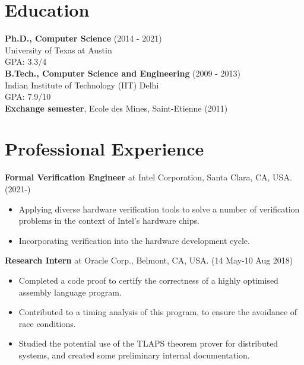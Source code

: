 \documentclass[margin]{res}
\begin{document}

\address{Department of Computer Science \\University of Texas at Austin }

\address{+1 512-952-0104 \\ \url{www.cs.utexas.edu/~mihir} }


\begin{resume}


\section{Education}
{\bf Ph.D., Computer Science} \hfill (2014 - 2021)\\
University of Texas at Austin\\
GPA: 3.3/4\\
{\bf B.Tech., Computer Science and Engineering} \hfill (2009 - 2013)\\
Indian Institute of Technology (IIT) Delhi\\
GPA: 7.9/10\\
{\bf Exchange semester}, Ecole des Mines, Saint-Etienne \hfill (2011)

\section{Professional Experience}

 {\bf Formal Verification Engineer} at Intel Corporation, Santa Clara,
 CA, USA. \hfill (2021-)
 \begin{itemize} \itemsep -2pt  %
 \item Applying diverse hardware verification tools to solve a number
   of verification problems in the context of Intel's hardware chips.
 \item Incorporating verification into the hardware development cycle.
 \end{itemize}

 {\bf Research Intern} at Oracle Corp., Belmont, CA, USA. \hfill (14
 May-10 Aug 2018)
 \begin{itemize} \itemsep -2pt  %
 \item Completed a code proof to certify the correctness of a highly
   optimised assembly language program.
 \item Contributed to a timing analysis of this program, to ensure the
   avoidance of race conditions.
 \item Studied the potential use of the TLAPS theorem prover for
   distributed systems, and created some preliminary internal
   documentation.
 \end{itemize}


\end{resume}
\end{document}
